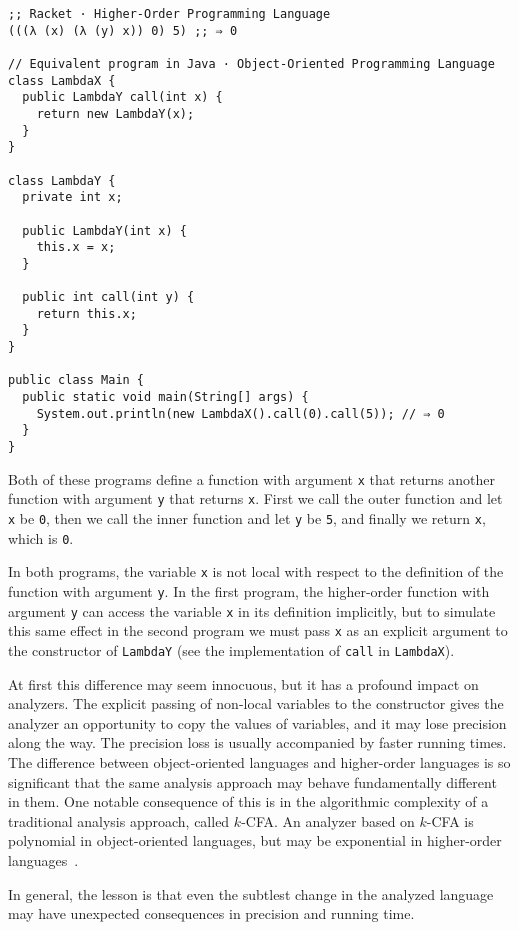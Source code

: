 \documentclass[12pt, oneside]{book}
\begin{document}
\begin{Verbatim}
;; Racket · Higher-Order Programming Language
(((λ (x) (λ (y) x)) 0) 5) ;; ⇒ 0

// Equivalent program in Java · Object-Oriented Programming Language
class LambdaX {
  public LambdaY call(int x) {
    return new LambdaY(x);
  }
}

class LambdaY {
  private int x;

  public LambdaY(int x) {
    this.x = x;
  }

  public int call(int y) {
    return this.x;
  }
}

public class Main {
  public static void main(String[] args) {
    System.out.println(new LambdaX().call(0).call(5)); // ⇒ 0
  }
}
\end{Verbatim}

Both of these programs define a function with argument \texttt{x} that returns another function with argument \texttt{y} that returns \texttt{x}. First we call the outer function and let \texttt{x} be \texttt{0}, then we call the inner function and let \texttt{y} be \texttt{5}, and finally we return \texttt{x}, which is \texttt{0}.

In both programs, the variable \texttt{x} is not local with respect to the definition of the function with argument \texttt{y}. In the first program, the higher-order function with argument \texttt{y} can access the variable \texttt{x} in its definition implicitly, but to simulate this same effect in the second program we must pass \texttt{x} as an explicit argument to the constructor of \texttt{LambdaY} (see the implementation of \texttt{call} in \texttt{LambdaX}).

At first this difference may seem innocuous, but it has a profound impact on analyzers. The explicit passing of non-local variables to the constructor gives the analyzer an opportunity to copy the values of variables, and it may lose precision along the way. The precision loss is usually accompanied by faster running times. The difference between object-oriented languages and higher-order languages is so significant that the same analysis approach may behave fundamentally different in them. One notable consequence of this is in the algorithmic complexity of a traditional analysis approach, called \(k\)-CFA. An analyzer based on \(k\)-CFA is polynomial in object-oriented languages, but may be exponential in higher-order languages~\cite{m-cfa}.

In general, the lesson is that even the subtlest change in the analyzed language may have unexpected consequences in precision and running time.
\end{document}
